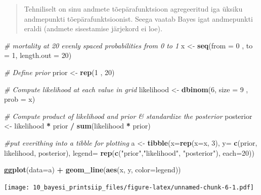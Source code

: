 \documentclass[]{book}
\newenvironment{Shaded}{\begin{snugshade}}{\end{snugshade}}
\newcommand{\KeywordTok}[1]{\textcolor[rgb]{0.13,0.29,0.53}{\textbf{#1}}}
\newcommand{\DataTypeTok}[1]{\textcolor[rgb]{0.13,0.29,0.53}{#1}}
\newcommand{\DecValTok}[1]{\textcolor[rgb]{0.00,0.00,0.81}{#1}}
\newcommand{\StringTok}[1]{\textcolor[rgb]{0.31,0.60,0.02}{#1}}
\newcommand{\CommentTok}[1]{\textcolor[rgb]{0.56,0.35,0.01}{\textit{#1}}}
\newcommand{\OperatorTok}[1]{\textcolor[rgb]{0.81,0.36,0.00}{\textbf{#1}}}
\newcommand{\NormalTok}[1]{#1}
\begin{document}
\begin{quote}
Tehniliselt on sinu andmete tõepärafunktsioon agregeeritud iga üksiku
andmepunkti tõepärafunktsioonist. Seega vaatab Bayes igat andmepunkti
eraldi (andmete sisestamise järjekord ei loe).
\end{quote}



\begin{Shaded}
\begin{Highlighting}[]
\CommentTok{# mortality at 20 evenly spaced probabilities from 0 to 1}
\NormalTok{x <-}\StringTok{ }\KeywordTok{seq}\NormalTok{(}\DataTypeTok{from =} \DecValTok{0}\NormalTok{ , }\DataTypeTok{to =} \DecValTok{1}\NormalTok{, }\DataTypeTok{length.out =} \DecValTok{20}\NormalTok{)}

\CommentTok{# Define prior}
\NormalTok{prior <-}\StringTok{ }\KeywordTok{rep}\NormalTok{(}\DecValTok{1}\NormalTok{ , }\DecValTok{20}\NormalTok{)}

\CommentTok{# Compute likelihood at each value in grid}
\NormalTok{likelihood <-}\StringTok{ }\KeywordTok{dbinom}\NormalTok{(}\DecValTok{6}\NormalTok{, }\DataTypeTok{size =} \DecValTok{9}\NormalTok{ , }\DataTypeTok{prob =}\NormalTok{ x)}

\CommentTok{# Compute product of likelihood and prior & standardize the posterior}
\NormalTok{posterior <-}\StringTok{ }\NormalTok{likelihood }\OperatorTok{*}\StringTok{ }\NormalTok{prior }\OperatorTok{/}\StringTok{ }\KeywordTok{sum}\NormalTok{(likelihood }\OperatorTok{*}\StringTok{ }\NormalTok{prior)}

\CommentTok{#put everithing into a tibble for plotting}
\NormalTok{a <-}\StringTok{ }\KeywordTok{tibble}\NormalTok{(}\DataTypeTok{x=}\KeywordTok{rep}\NormalTok{(}\DataTypeTok{x=}\NormalTok{x, }\DecValTok{3}\NormalTok{),}
            \DataTypeTok{y=} \KeywordTok{c}\NormalTok{(prior, likelihood, posterior),}
            \DataTypeTok{legend=} \KeywordTok{rep}\NormalTok{(}\KeywordTok{c}\NormalTok{(}\StringTok{"prior"}\NormalTok{,}\StringTok{"likelihood"}\NormalTok{, }\StringTok{"posterior"}\NormalTok{), }\DataTypeTok{each=}\DecValTok{20}\NormalTok{))}

\KeywordTok{ggplot}\NormalTok{(}\DataTypeTok{data=}\NormalTok{a) }\OperatorTok{+}\StringTok{ }\KeywordTok{geom_line}\NormalTok{(}\KeywordTok{aes}\NormalTok{(x, y, }\DataTypeTok{color=}\NormalTok{legend))}
\end{Highlighting}
\end{Shaded}

\texttt{[image: 10\_bayesi\_printsiip\_files/figure-latex/unnamed-chunk-6-1.pdf]}
\end{document}
